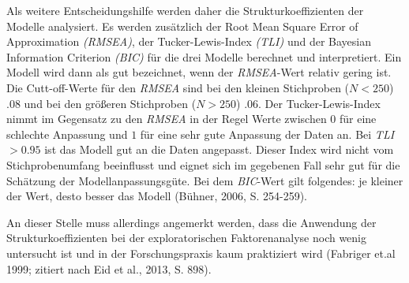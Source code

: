 \documentclass[12pt,a4paper]{article}
\begin{document}
	 Als weitere Entscheidungshilfe werden daher die Strukturkoeffizienten der Modelle analysiert. Es werden zusätzlich der Root Mean Square Error of Approximation \textit{(RMSEA)}, der Tucker-Lewis-Index \textit{(TLI)} und der Bayesian Information Criterion \textit{(BIC)} für die drei Modelle berechnet und interpretiert. Ein Modell wird dann als gut bezeichnet, wenn der \textit{RMSEA}-Wert relativ gering ist. Die Cutt-off-Werte für den \textit{RMSEA} sind bei den kleinen Stichproben ($N < 250$) $.08$ und bei den größeren Stichproben ($N > 250$) $.06.$ Der Tucker-Lewis-Index nimmt im Gegensatz zu den \textit{RMSEA} in der Regel Werte zwischen $0$ für eine schlechte Anpassung und $1$ für eine sehr gute Anpassung der Daten an. Bei \textit{TLI}$> 0.95$ ist das Modell gut an die Daten angepasst. Dieser Index wird nicht vom Stichprobenumfang beeinflusst und eignet sich im gegebenen Fall sehr gut für die Schätzung der Modellanpassungsgüte. Bei dem \textit{BIC}-Wert gilt folgendes: je kleiner der Wert, desto besser das Modell (Bühner, 2006, S. 254-259).
	 
	An dieser Stelle muss allerdings angemerkt werden, dass die Anwendung der Strukturkoeffizienten bei der exploratorischen Faktorenanalyse noch wenig untersucht ist und in der Forschungspraxis kaum praktiziert wird (Fabriger et.al 1999; zitiert nach Eid et al., 2013, S. 898).
	
\end{document}
